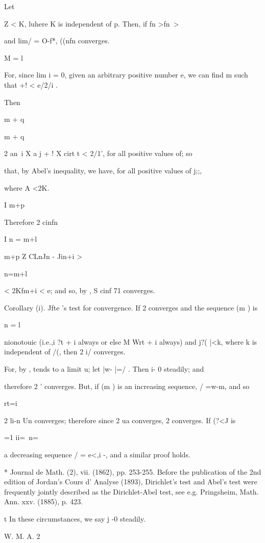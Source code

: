 Let

Z < K, luhere K is independent of p. Then, if fn >fn\-\ >

and lim/ = O-f*, ((nfn converges.

M = l

For, since lim i = 0, given an arbitrary positive number e, we can
find m such that +! < e/2/i .

Then

m + q

m + q

2 an\ i X a j + ! X cirt t < 2/1', for all positive values of; so

that, by Abel's inequality, we have, for all positive values of j;;,

where A <2K.

I m+p

Therefore 2 cinfn

I n = m+l

m+p Z CLnJn - Jin+i >

n=m+l

< 2Kfm+i < e; and so, by , S cinf 71 converges.

Corollary (i). Jfte 's test for convergence. If 2 converges and the
sequence (m ) is

n = l

nionotouic (i.e.,i ?t + i always or else M Wrt + i always) and j?(
|<k, where k is independent of /(, then 2 i/ converges.

For, by , tends to a limit u; let |w- |=/ . Then i- 0 steadily;
and

therefore 2 ' converges. But, if (m ) is an increasing sequence, /
=w-m, and so

rt=i

2 li-n Un converges; therefore since 2 ua converges, 2 converges. If
(?<J is

 =1 ii=\ n=\

a decreasing sequence / = e<,i -, and a similar proof holds.

* Journal de Math. (2), vii. (1862), pp. 253-255. Before the
publication of the 2nd edition of Jordan's Cours d' Analyse (1893),
Dirichlet's test and Abel's test were frequently jointly described as
the Dirichlet-Abel test, see e.g. Pringsheim, Math. Ann. xxv. (1885),
p. 423.

t In these circumstances, we say j -0 steadily.

W. M. A. 2

%
%

